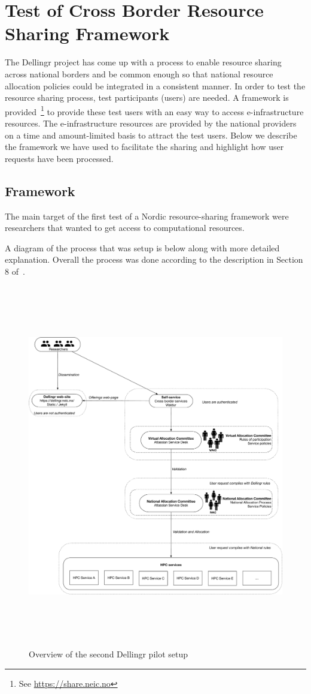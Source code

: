 \documentclass{article}
\newcommand{\dell}{Dellingr\xspace}
\newcommand{\einfra}{e-infrastructure\xspace}
\newcommand{\np}{national provider\xspace}
\newcommand{\nps}{\np{s}\xspace}
\newcommand{\pilot}{first test of a Nordic resource-sharing framework\xspace}
\begin{document}
\section{Test of Cross Border Resource Sharing Framework}

The \dell project has come up with a process to enable resource sharing across national borders and be common enough so that national resource allocation policies could be integrated in a consistent manner.
In order to test the resource sharing process, test participants (users) are needed.
A framework is provided~\footnote{See \url{https://share.neic.no}} to provide these test users with an easy way to access \einfra resources.
The \einfra resources are provided by the \nps on a time and amount-limited basis to attract the test users.
Below we describe the framework we have used to facilitate the sharing and highlight how user requests have been processed.

\subsection{Framework}
\label{ssec:framework}

The main target of the \pilot were researchers that wanted to get access to computational resources.

A diagram of the process that was setup is below along with more detailed explanation. 
Overall the process was done according to the description in Section 8 
of~\cite{dellingr-p2-do5}.

\begin{figure}
\centering
\includegraphics[height=450pt]{diagram.pdf}
\caption{Overview of the second \dell pilot setup}
\end{figure}
\end{document}
